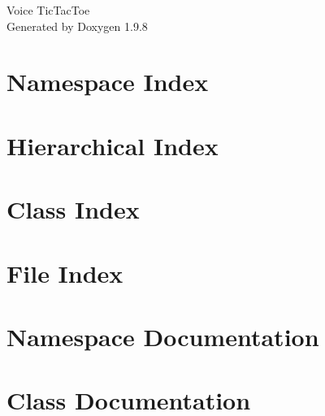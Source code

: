\documentclass[twoside]{book}
\newcommand{\+}{\discretionary{\mbox{\scriptsize$\hookleftarrow$}}{}{}}
\newcommand{\clearemptydoublepage}{%
    \newpage{\pagestyle{empty}\cleardoublepage}%
  }
\begin{document}
  \raggedbottom
    \hypersetup{pageanchor=false,
                bookmarksnumbered=true,
                pdfencoding=unicode
               }
  \begin{titlepage}
  \vspace*{7cm}
  \begin{center}%
  {\Large Voice Tic\+Tac\+Toe}\\
  \vspace*{1cm}
  {\large Generated by Doxygen 1.9.8}\\
  \end{center}
  \end{titlepage}
  \clearemptydoublepage
  \tableofcontents
  \clearemptydoublepage
  \hypersetup{pageanchor=true}
\chapter{Namespace Index}

\chapter{Hierarchical Index}

\chapter{Class Index}

\chapter{File Index}

\chapter{Namespace Documentation}

\chapter{Class Documentation}














\end{document}
